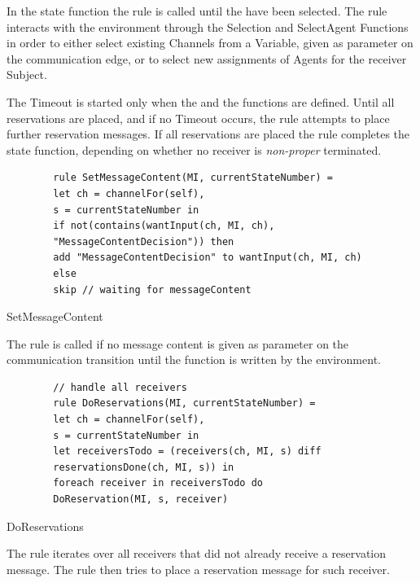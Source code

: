 In the state function the  rule is called until
the  have been selected. The  rule
interacts with the environment through the Selection and SelectAgent Functions
in order to either select existing Channels from a Variable, given as parameter
on the communication edge, or to select new assignments of Agents for the receiver
Subject.

The Timeout is started only when the  and the
 functions are defined. Until all reservations are
placed, and if no Timeout occurs, the  rule attempts
to place further reservation messages. If all reservations are placed the
 rule completes the state function, depending
on whether no receiver is \textit{non-proper} terminated.

\begin{listing}[H]
	\begin{verbatim}
		rule SetMessageContent(MI, currentStateNumber) =
		let ch = channelFor(self),
		s = currentStateNumber in
		if not(contains(wantInput(ch, MI, ch),
		"MessageContentDecision")) then
		add "MessageContentDecision" to wantInput(ch, MI, ch)
		else
		skip // waiting for messageContent
	\end{verbatim}
	\caption{SetMessageContent}
	\label{lst:shortasm:SetMessageContent}
\end{listing}

The  rule is called if no message content is
given as parameter on the communication transition until the 
function is written by the environment.

\begin{listing}[H]
	\begin{verbatim}
		// handle all receivers
		rule DoReservations(MI, currentStateNumber) =
		let ch = channelFor(self),
		s = currentStateNumber in
		let receiversTodo = (receivers(ch, MI, s) diff
		reservationsDone(ch, MI, s)) in
		foreach receiver in receiversTodo do
		DoReservation(MI, s, receiver)
	\end{verbatim}
	\caption{DoReservations}
	\label{lst:shortasm:DoReservations}
\end{listing}

The  rule iterates over all receivers that did not
already receive a reservation message. The  rule
then tries to place a reservation message for such receiver.

